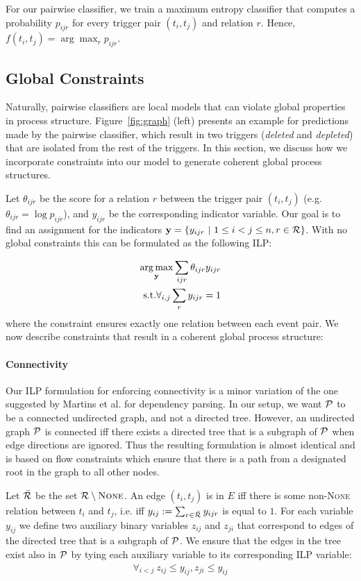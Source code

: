 For our pairwise classifier, we train a maximum entropy classifier that computes a probability $p_{ijr}$ for every trigger pair $(t_i,t_j)$ and relation $r$. Hence, $f(t_i,t_j)= \arg\max_r p_{ijr}$.

\subsection{Global Constraints} \label{subsec:global}
Naturally, pairwise classifiers are local models that can violate global properties in process structure. Figure~\ref{fig:graph} (left) presents an example for predictions made by the pairwise classifier, which result in two triggers (\emph{deleted} and \emph{depleted}) that are isolated from the rest of the triggers. In this section, we discuss how we incorporate constraints into our model to generate coherent global process structures.

Let $\theta_{ijr}$ be the score for a relation $r$ between the trigger pair $(t_i,t_j)$ (e.g. $\theta_{ijr}=\log p_{ijr}$), and $y_{ijr}$ be the corresponding indicator variable. Our goal is to find an assignment for the indicators $\by=\{y_{ijr} \ | \ 1 \leq i < j \leq n, r \in \sR \}$. With no global constraints this can be formulated as the following ILP:

\begin{align}
\operatorname*{arg\,max}_{\mathbf{y}} \sum_{ijr} \theta_{ijr} y_{ijr} \\
\mbox{s.t.} \forall_{i,j} \sum_r y_{ijr}=1 \nonumber
\end{align}
\noindent where the constraint ensures exactly one relation between each event pair. We now describe constraints that result in a coherent global process structure:

\paragraph{Connectivity} 
Our ILP formulation for enforcing connectivity is a minor variation of the one suggested by Martins et al.  for dependency parsing. In our setup, we want $\mathcal{P}$ to be a connected undirected graph, and not a directed tree. However, an undirected graph $\mathcal{P}$ is connected iff there exists a directed tree that is a subgraph of $\mathcal{P}$ when edge directions are ignored. Thus the resulting formulation is almost identical and is based on flow constraints which ensure that there is a path from a designated root in the graph to all other nodes.

 Let $\bar{\mathcal{R}}$ be the set $\mathcal{R} \setminus \mbox{\textsc{None}}$. An edge $(t_i,t_j)$ is in $E$ iff there is some non-\textsc{None} relation between $t_i$ and $t_j$, i.e. iff $y_{ij}:=\sum_{r \in \bar{\mathcal{R}}} y_{ijr}$ is equal to $1$. For each variable $y_{ij}$ we define two auxiliary binary variables $z_{ij}$ and $z_{ji}$ that correspond to edges of the directed tree that is a subgraph of $\mathcal{P}$. We ensure that the edges in the tree exist also in $\mathcal{P}$ by tying each auxiliary variable to its corresponding ILP variable:
\begin{align}
\forall_{i<j} \ z_{ij} \leq y_{ij}, z_{ji} \leq y_{ij}
\end{align}


